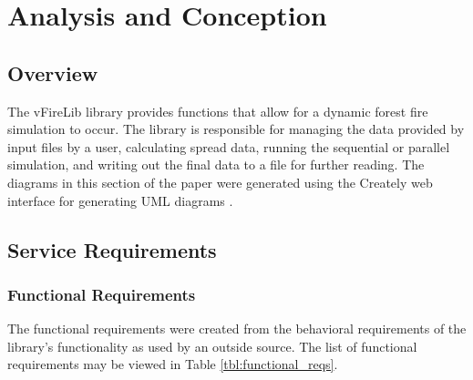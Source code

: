 \chapter{Analysis and Conception}
\label{chapter:design}

\section{Overview}
The vFireLib library provides functions that allow for a dynamic forest fire simulation to occur. The library is responsible for managing the data provided by input files by a user, calculating spread data, running the sequential or parallel simulation, and writing out the final data to a file for further reading. The diagrams in this section of the paper were generated using the Creately web interface for generating UML diagrams \cite{creately}. 

\section{Service Requirements}

\subsection{Functional Requirements}
The functional requirements were created from the behavioral requirements of the library's functionality as used by an outside source. The list of functional requirements may be viewed in Table \ref{tbl:functional_reqs}.

